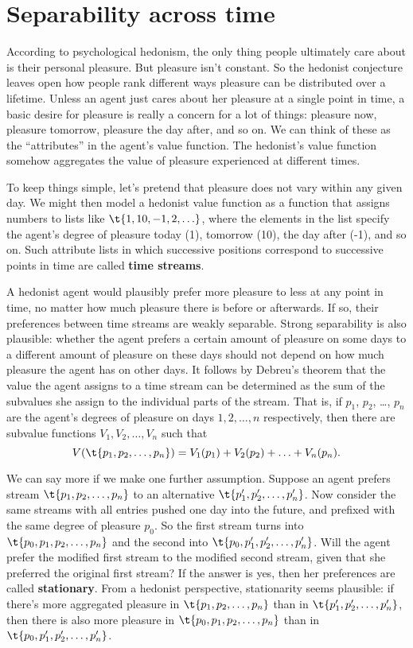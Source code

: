 {} %

\section{Separability across time}\label{sec:separability-time}

According to psychological hedonism, the only thing people ultimately
care about is their personal pleasure. But pleasure isn't constant. So
the hedonist conjecture leaves open how people rank different ways
pleasure can be distributed over a lifetime. Unless an agent just
cares about her pleasure at a single point in time, a basic desire for
pleasure is really a concern for a lot of things: pleasure now,
pleasure tomorrow, pleasure the day after, and so on. We can think of
these as the ``attributes'' in the agent's value function. The
hedonist's value function somehow aggregates the value of pleasure
experienced at different times.

To keep things simple, let's pretend that pleasure does not vary
within any given day. We might then model a hedonist value function as
a function that assigns numbers to lists like $\t{1,10,-1,2,\ldots}$,
where the elements in the list specify the agent's degree of pleasure
today (1), tomorrow (10), the day after (-1), and so on. Such
attribute lists in which successive positions correspond to successive
points in time are called \textbf{time streams}.

A hedonist agent would plausibly prefer more pleasure to less at any
point in time, no matter how much pleasure there is before or
afterwards. If so, their preferences between time streams are weakly
separable. Strong separability is also plausible: whether the agent
prefers a certain amount of pleasure on some days to a different
amount of pleasure on these days should not depend on how much
pleasure the agent has on other days. It follows by Debreu's theorem
that the value the agent assigns to a time stream can be determined as
the sum of the subvalues she assign to the individual parts of the
stream. That is, if $p_1$, $p_2$, \ldots, $p_n$ are the agent's
degrees of pleasure on days $1, 2, \ldots, n$ respectively, then there
are subvalue functions $V_1,V_2,\ldots,V_n$ such that
\[
V(\t{p_1,p_2,\ldots,p_n}) = V_1(p_1) + V_2(p_2) + \ldots + V_n(p_n).
\]

We can say more if we make one further assumption. Suppose an agent
prefers stream $\t{p_1,p_2,\ldots,p_n}$ to an alternative
$\t{p_1',p_2',\ldots,p_n'}$. Now consider the same streams with all
entries pushed one day into the future, and prefixed with the same
degree of pleasure $p_0$. So the first stream turns into $\t{p_0,
  p_1,p_2,\ldots,p_n}$ and the second into $\t{p_0,
  p_1',p_2',\ldots,p_n'}$. Will the agent prefer the modified first
stream to the modified second stream, given that she preferred the
original first stream? If the answer is yes, then her preferences are
called \textbf{stationary}. From a hedonist perspective, stationarity
seems plausible: if there's more aggregated pleasure in
$\t{p_1,p_2,\ldots,p_n}$ than in $\t{p_1',p_2',\ldots,p_n'}$, then
there is also more pleasure in $\t{p_0,p_1,p_2,\ldots,p_n}$ than in
$\t{p_0,p_1',p_2',\ldots,p_n'}$.

